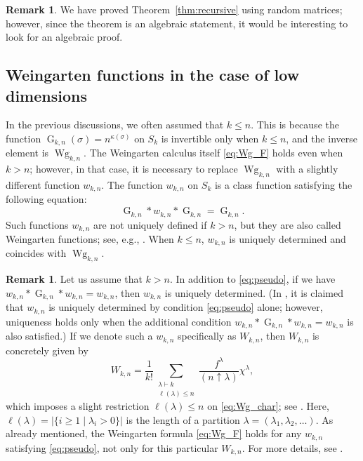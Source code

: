 \documentclass[pdftex]{sigma}
\numberwithin{equation}{section}
\theoremstyle{definition}
\newtheorem{Remark}[Theorem]{Remark}
\DeclareMathOperator{\G}{G}
\DeclareMathOperator{\Wg}{Wg}
\begin{document}
\begin{Remark}
 We have proved Theorem~\ref{thm:recursive} using random matrices; however, since the theorem is an algebraic statement, it would be interesting to look for an algebraic proof.
\end{Remark}

\subsection{Weingarten functions in the case of low dimensions} \label{subsec:low_dim}

In the previous discussions, we often assumed that $k \le n$.
This is because the function $\G_{k,n}(\sigma)=n^{\kappa(\sigma)}$ on $S_k$ is invertible only when $k \le n$, and the inverse element is $\Wg_{k,n}$.
The Weingarten calculus itself \eqref{eq:Wg_F} holds even when $k > n$; however, in that case, it is necessary to replace $\Wg_{k,n}$ with a slightly different function $w_{k,n}$.
The function $w_{k,n}$ on $S_k$ is a class function satisfying the following equation:
\begin{equation} \label{eq:pseudo}
\G_{k,n} * w_{k,n} * \G_{k,n} = \G_{k,n}.
\end{equation}
Such functions $w_{k,n}$ are not uniquely defined if $k >n$, but they are also called Weingarten functions; see, e.g., \cite{CollinsMatsumoto2009}.
When $k \le n$, $w_{k,n}$ is uniquely determined and coincides with $\Wg_{k,n}$.

\begin{Remark}
Let us assume that $k>n$.
In addition to \eqref{eq:pseudo},
if we have
$w_{k,n} *\G_{k,n} *w_{k,n} = w_{k,n}$,
then $w_{k,n}$ is uniquely determined.
(In \cite{MatsumotoCSS}, it is claimed that $w_{k,n}$ is uniquely determined by condition \eqref{eq:pseudo} alone; however, uniqueness holds only when the additional condition
$w_{k,n} * \G_{k,n} * w_{k,n} = w_{k,n}$
is also satisfied.)
If we denote such a $w_{k,n}$ specifically as $W_{k,n}$, then $W_{k,n}$ is concretely given by
\[
W_{k,n}=\frac{1}{k!} \sum_{\substack{\lambda \vdash k \\ \ell(\lambda) \le n}} \frac{f^\lambda}{(n \uparrow \lambda)} \chi^\lambda,
\]
which imposes a slight restriction $\ell(\lambda) \le n$ on \eqref{eq:Wg_char};
 see \cite[Proposition 2.3]{CollinsSniady2006}.
Here, $\ell(\lambda)=|\{i \ge 1 \mid \lambda_i>0\}|$ is the length of a partition $\lambda=(\lambda_1,\lambda_2,\dots)$.
As already mentioned, the Weingarten formula \eqref{eq:Wg_F} holds for any $w_{k,n}$ satisfying \eqref{eq:pseudo}, not only for this particular $W_{k,n}$.
For more details, see \cite{CollinsFukudaMatsumoto}.
\end{Remark}
\end{document}

